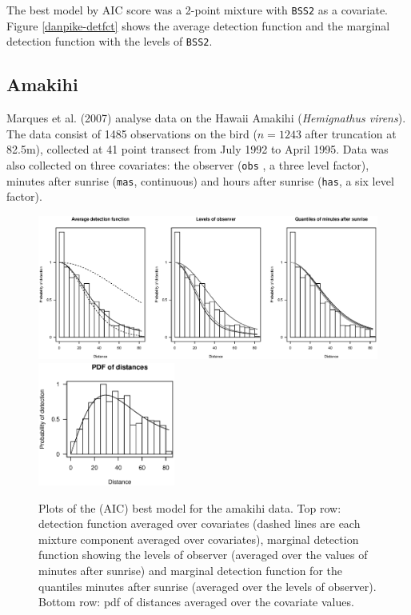 \documentclass[useAMS,referee, usegraphicx]{biom}
\begin{document}
The best model by AIC score was a 2-point mixture with \texttt{BSS2} as a covariate. Figure \ref{danpike-detfct} shows the average detection function and the marginal detection function with the levels of \texttt{BSS2}.

\subsection{Amakihi}
Marques et al. (2007) analyse data on the Hawaii Amakihi (\textit{Hemignathus virens}). The data consist of 1485 observations on the bird ($n=1243$ after truncation at 82.5m), collected at 41 point transect from July 1992 to April 1995. Data was also collected on three covariates: the observer (\texttt{obs} , a three level factor), minutes after sunrise (\texttt{mas}, continuous) and hours after sunrise (\texttt{has}, a six level factor).

\begin{figure}
\centering
\includegraphics[width=\textwidth]{analyses/amakihi-om.eps}\\
\includegraphics[width=0.4\textwidth]{analyses/amakihi-om-pdf.eps}
\caption{Plots of the (AIC) best model for the amakihi data. Top row: detection function averaged over covariates (dashed lines are each mixture component averaged over covariates), marginal detection function showing the levels of observer (averaged over the values of minutes after sunrise) and marginal detection function for the quantiles minutes after sunrise (averaged over the levels of observer). Bottom row: pdf of distances averaged over the covariate values.}
\label{amakihi}
\end{figure}
\end{document}
